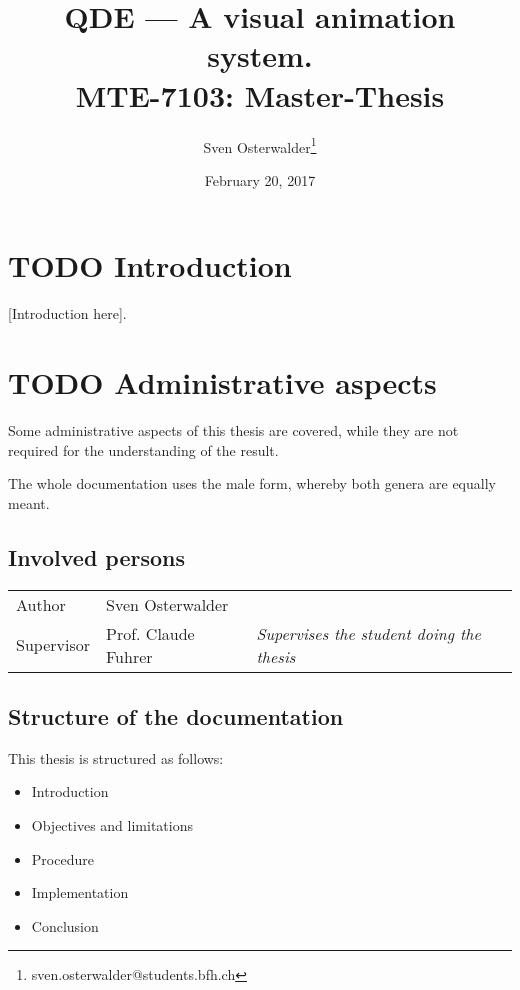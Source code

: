 \documentclass[10pt, openright, notitlepage]{scrreprt}
\author{Sven Osterwalder\thanks{sven.osterwalder@students.bfh.ch}}
\date{February 20, 2017}
\title{QDE --- A visual animation system.\\\medskip
\large MTE-7103: Master-Thesis}
\begin{document}
\maketitle
\tableofcontents


\chapter{{\bfseries\sffamily TODO} Introduction}
\label{sec:orgfe27747}

[Introduction here].

\chapter{{\bfseries\sffamily TODO} Administrative aspects}
\label{sec:orga79b7b5}

Some administrative aspects of this thesis are covered, while they are not
required for the understanding of the result.

The whole documentation uses the male form, whereby both genera are equally
meant.

\section{Involved persons}
\label{sec:org47842a1}

\begin{center}
\begin{tabular}{lll}
Author & Sven Osterwalder\footnotemark & \\
Supervisor & Prof. Claude Fuhrer\footnotemark & \emph{Supervises the student doing the thesis}\\
\end{tabular}
\end{center}

\section{Structure of the documentation}
\label{sec:orgba7c0f3}

This thesis is structured as follows:

\begin{itemize}
\item Introduction
\item Objectives and limitations
\item Procedure
\item Implementation
\item Conclusion
\end{itemize}
\end{document}
